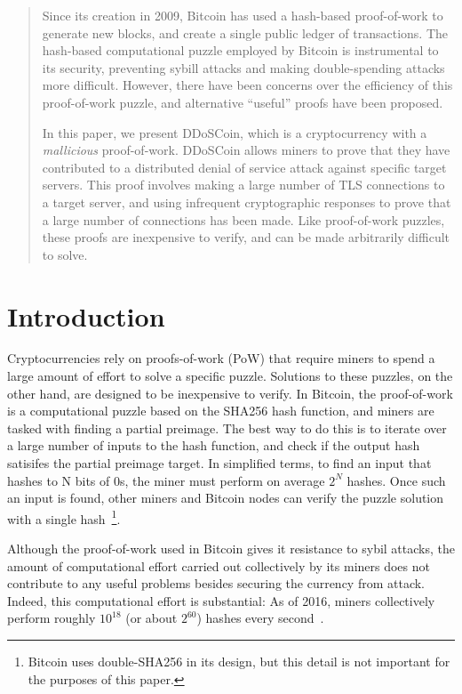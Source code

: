 



\begin{abstract}

Since its creation in 2009, Bitcoin has used a hash-based proof-of-work to
generate new blocks, and create a single public ledger of transactions. The
hash-based computational puzzle employed by Bitcoin is instrumental to its
security, preventing sybill attacks and making double-spending attacks more
difficult. However, there have been concerns over the efficiency of this
proof-of-work puzzle, and alternative ``useful'' proofs have been proposed.

In this paper, we present DDoSCoin, which is a cryptocurrency with a
\emph{mallicious} proof-of-work. DDoSCoin allows miners to prove that they have
contributed to a distributed denial of service attack against specific target
servers.  This proof involves making a large number of TLS connections to a
target server, and using infrequent cryptographic responses to prove that a
large number of connections has been made. Like proof-of-work puzzles, these
proofs are inexpensive to verify, and can be made arbitrarily difficult to
solve.

\end{abstract}




\section{Introduction}


Cryptocurrencies rely on proofs-of-work (PoW) that require miners to spend a
large amount of effort to solve a specific puzzle.  Solutions to these puzzles,
on the other hand, are designed to be inexpensive to verify. In Bitcoin, the
proof-of-work is a computational puzzle based on the SHA256 hash function, and
miners are tasked with finding a partial preimage. The best way to do this is to
iterate over a large number of inputs to the hash function, and check if the
output hash satisifes the partial preimage target. In simplified terms, to find
an input that hashes to N bits of 0s, the miner must perform on average $2^{N}$
hashes. Once such an input is found, other miners and Bitcoin nodes can verify the
puzzle solution with a single hash~\footnote{Bitcoin uses double-SHA256 in its
design, but this detail is not important for the purposes of this paper.}.


Although the proof-of-work used in Bitcoin gives it resistance to sybil attacks,
the amount of computational effort carried out collectively by its miners does
not contribute to any useful problems besides securing the currency from attack.
Indeed, this computational effort is substantial: As of 2016, miners
collectively perform roughly $10^{18}$ (or about $2^{60}$) hashes every
second~\cite{blockchain-hashrate}.

